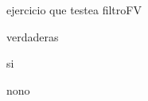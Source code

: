 \documentclass{gift}
\begin{document}
\begin{giftComentario}
ejercicio que testea filtroFV
\end  {giftComentario}
\begin{giftFragmento}
verdaderas\end  {giftFragmento}


\begin{giftMO}
\item \begin{giftFragmento}
si\end  {giftFragmento}


\item \begin{giftFragmento}
nono\end  {giftFragmento}


\end  {giftMO}

\begin{giftFragmento}
\end  {giftFragmento}


\begin{giftComentario}

\end  {giftComentario}
\end{document}
